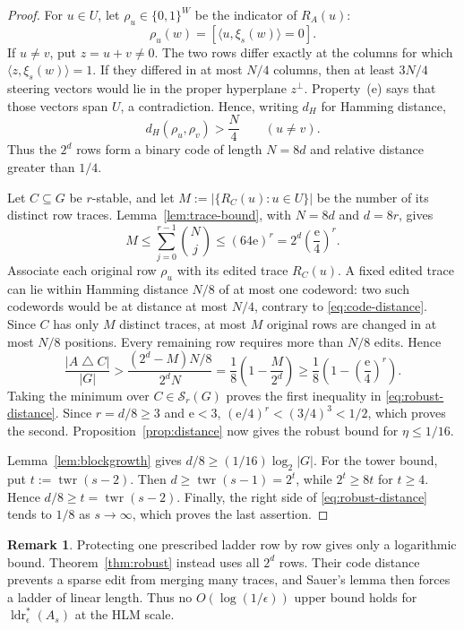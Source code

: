 \documentclass[11pt]{article}
\theoremstyle{plain}
\theoremstyle{definition}
\newtheorem{remark}[theorem]{Remark}
\numberwithin{theorem}{section}
\newcommand{\inner}[2]{\langle #1,#2\rangle}
\newcommand{\abs}[1]{\lvert #1\rvert}
\newcommand{\twr}{\operatorname{twr}}
\newcommand{\ldrs}{\operatorname{ldr}^{*}}
\newcommand{\Stable}{\mathcal{S}}
\newcommand{\econst}{\mathrm e}
\begin{document}
\begin{proof}
For $u\in U$, let $\rho_u\in\{0,1\}^{W}$ be the indicator of $R_A(u)$:
\[
  \rho_u(w)=[\inner{u}{\xi_s(w)}=0].
\]
If $u\ne v$, put $z=u+v\ne0$.  The two rows differ exactly at the columns
for which $\inner{z}{\xi_s(w)}=1$.  If they differed in at most $N/4$
columns, then at least $3N/4$ steering vectors would lie in the proper
hyperplane $z^\perp$.  Property~\textup{(e)} says that those vectors span
$U$, a contradiction.  Hence, writing $d_H$ for Hamming distance,
\begin{equation}\label{eq:code-distance}
  d_H(\rho_u,\rho_v)>\frac N4\qquad(u\ne v).
\end{equation}
Thus the $2^d$ rows form a binary code of length $N=8d$ and relative
distance greater than $1/4$.

Let $C\subseteq G$ be $r$-stable, and let
$M:=\abs{\{R_C(u):u\in U\}}$ be the number of its distinct row traces.
Lemma~\ref{lem:trace-bound}, with $N=8d$ and $d=8r$, gives
\begin{equation}\label{eq:stable-traces}
  M\le\sum_{j=0}^{r-1}\binom Nj
  \le(64\econst)^r
  =2^d\left(\frac{\econst}{4}\right)^r.
\end{equation}
Associate each original row $\rho_u$ with its edited trace $R_C(u)$.  A fixed
edited trace can lie within Hamming distance $N/8$ of at most one codeword:
two such codewords would be at distance at most $N/4$, contrary to
\eqref{eq:code-distance}.  Since $C$ has only $M$ distinct traces, at most
$M$ original rows are changed in at most $N/8$ positions.  Every remaining
row requires more than $N/8$ edits.  Hence
\[
  \frac{\abs{A\mathbin\triangle C}}{\abs G}
  >\frac{(2^d-M)N/8}{2^dN}
  =\frac18\left(1-\frac{M}{2^d}\right)
  \ge\frac18\left(1-\left(\frac{\econst}{4}\right)^r\right).
\]
Taking the minimum over $C\in\Stable_r(G)$ proves the first inequality in
\eqref{eq:robust-distance}.  Since $r=d/8\ge3$ and $\econst<3$,
$(\econst/4)^r<(3/4)^3<1/2$, which proves the second.
Proposition~\ref{prop:distance} now gives the robust bound for
$\eta\le1/16$.

Lemma~\ref{lem:blockgrowth} gives
$d/8\ge(1/16)\log_2\abs G$.  For the tower bound, put
$t:=\twr(s-2)$.  Then $d\ge\twr(s-1)=2^t$, while $2^t\ge8t$ for
$t\ge4$.  Hence $d/8\ge t=\twr(s-2)$.  Finally, the right side of
\eqref{eq:robust-distance} tends to $1/8$ as $s\to\infty$, which proves the
last assertion.
\end{proof}

\begin{remark}\label{rem:log-false}
Protecting one prescribed ladder row by row gives only a logarithmic bound.
Theorem~\ref{thm:robust} instead uses all $2^d$ rows.  Their code distance
prevents a sparse edit from merging many traces, and Sauer's lemma then
forces a ladder of linear length.  Thus no
$O(\log(1/\epsilon))$ upper bound holds for
$\ldrs_\epsilon(A_s)$ at the HLM scale.
\end{remark}
\end{document}
